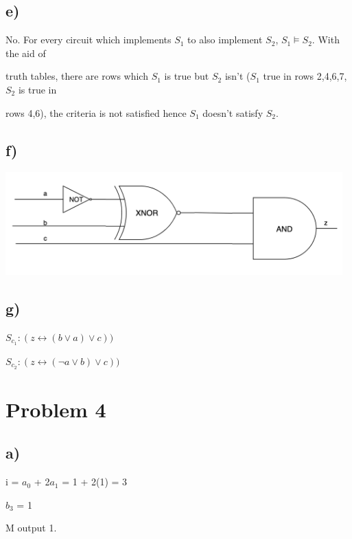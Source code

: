 \documentclass{article} %
\begin{document}
\subsection*{\hspace{1cm}e)}
\begin{flushleft}
\hspace{2cm}No. For every circuit which implements $S_1$ to also implement $S_2$, $S_1 \models S_2$. With the aid of 

\hspace{2cm}truth tables, there are rows which $S_1$ is true but $S_2$ isn't ($S_1$ true in rows 2,4,6,7, $S_2$ is true in 

\hspace{2cm}rows 4,6), the criteria is not satisfied hence $S_1$ doesn't satisfy $S_2$.
\end{flushleft}

\subsection*{\hspace{1cm}f)}
\hspace{2cm}
\includegraphics[width=13cm]{Circuit.png}

\subsection*{\hspace{1cm}g)}
\begin{flushleft}
\hspace{2cm}$S_c_1: (z\leftrightarrow(b \lor a) \lor c))$

\hspace{2cm}$S_c_2: (z\leftrightarrow(\neg a \lor b) \lor c))$
\end{flushleft}

\section*{Problem 4}

\subsection*{\hspace{1cm}a)}
\begin{flushleft}
\hspace{2cm}i = $a_0$ + 2$a_1$ = 1 + 2(1) = 3

\hspace{2cm}$b_3$ = 1

\hspace{2cm}M output 1.
\end{flushleft}
\end{document}
